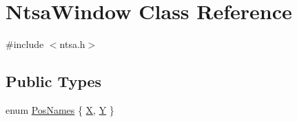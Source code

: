 \hypertarget{class_ntsa_window}{\section{Ntsa\-Window Class Reference}
\label{class_ntsa_window}
}


{\ttfamily \#include $<$ntsa.\-h$>$}

\subsection*{Public Types}
\begin{DoxyCompactItemize}
\item 
enum \hyperlink{class_ntsa_window_ad45cc5b45dd664a1dd979041e8ab17a3}{Pos\-Names} \{ \hyperlink{class_ntsa_window_ad45cc5b45dd664a1dd979041e8ab17a3a5959f03de015e8a12c91109a7ccd8ce2}{X}, 
\hyperlink{class_ntsa_window_ad45cc5b45dd664a1dd979041e8ab17a3ac63a6cdc64f8ce6c25e59baf4b53019f}{Y}
 \}
\end{DoxyCompactItemize}
